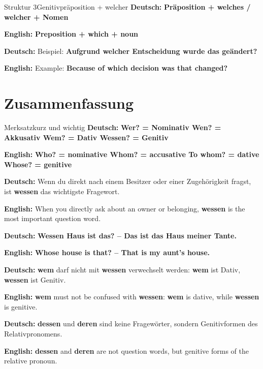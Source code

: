 \documentclass[a4paper,11pt]{article}
\newcommand{\GermanText}[1]{\textbf{Deutsch: }#1\par}
\newcommand{\EnglishText}[1]{{\small\color{SoftGray}\textbf{English: }#1\par}}
\begin{document}
        
        \begin{grammarentry}{Struktur 3}{Genitivpräposition + welcher}
            \GermanText{\textbf{Präposition + welches / welcher + Nomen}}
            \EnglishText{\textbf{Preposition + which + noun}}
            
            \GermanText{Beispiel: \textbf{Aufgrund welcher Entscheidung wurde das geändert?}}
            \EnglishText{Example: \textbf{Because of which decision was that changed?}}
        \end{grammarentry}
    
    
    \section{Zusammenfassung}
        
        \begin{grammarentry}{Merksatz}{kurz und wichtig}
            \GermanText{\textbf{Wer? = Nominativ \quad Wen? = Akkusativ \quad Wem? = Dativ \quad Wessen? = Genitiv}}
            \EnglishText{\textbf{Who? = nominative \quad Whom? = accusative \quad To whom? = dative \quad Whose? = genitive}}
            
            \GermanText{Wenn du direkt nach einem Besitzer oder einer Zugehörigkeit fragst, ist \textbf{wessen} das wichtigste Fragewort.}
            \EnglishText{When you directly ask about an owner or belonging, \textbf{wessen} is the most important question word.}
            
            \GermanText{\textbf{Wessen Haus ist das? -- Das ist das Haus meiner Tante.}}
            \EnglishText{\textbf{Whose house is that? -- That is my aunt's house.}}
            
            \GermanText{\textbf{wem} darf nicht mit \textbf{wessen} verwechselt werden: \textbf{wem} ist Dativ, \textbf{wessen} ist Genitiv.}
            \EnglishText{\textbf{wem} must not be confused with \textbf{wessen}: \textbf{wem} is dative, while \textbf{wessen} is genitive.}
            
            \GermanText{\textbf{dessen} und \textbf{deren} sind keine Fragewörter, sondern Genitivformen des Relativpronomens.}
            \EnglishText{\textbf{dessen} and \textbf{deren} are not question words, but genitive forms of the relative pronoun.}
        \end{grammarentry}
\end{document}
